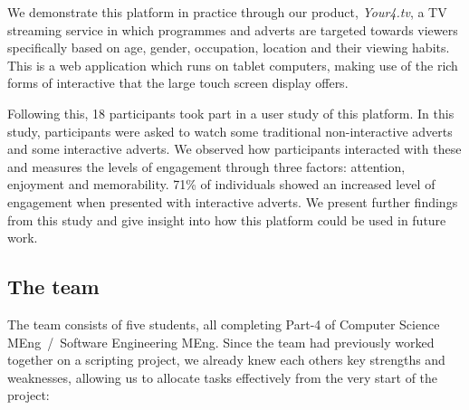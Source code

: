 We demonstrate this platform in practice through our product, \textit{Your4.tv}, a TV streaming service in which programmes and adverts are targeted towards viewers specifically based on age, gender, occupation, location and their viewing habits. This is a web application which runs on tablet computers, making use of the rich forms of interactive that the large touch screen display offers.

Following this, 18 participants took part in a user study of this platform. In this study, participants were asked to watch some traditional non-interactive adverts and some interactive adverts. We observed how participants interacted with these and measures the levels of engagement through three factors: attention, enjoyment and memorability. 71\% of individuals showed an increased level of engagement when presented with interactive adverts. We present further findings from this study and give insight into how this platform could be used in future work.




\subsection{The team}

The team consists of five students, all completing Part-4 of Computer Science MEng~/~Software Engineering MEng. Since the team had previously worked together on a scripting project, we already knew each others key strengths and weaknesses, allowing us to allocate tasks effectively from the very start of the project:

